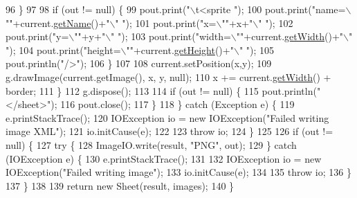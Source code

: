 \begin{DoxyCode}
96                 \}
97                 
98                 \textcolor{keywordflow}{if} (out != null) \{
99                     pout.print(\textcolor{stringliteral}{"\(\backslash\)t<sprite "});
100                     pout.print(\textcolor{stringliteral}{"name=\(\backslash\)""}+current.\mbox{\hyperlink{classorg_1_1newdawn_1_1slick_1_1_image_a3d7329c13259ffebd9efc30deb5655fc}{getName}}()+\textcolor{stringliteral}{"\(\backslash\)" "});
101                     pout.print(\textcolor{stringliteral}{"x=\(\backslash\)""}+x+\textcolor{stringliteral}{"\(\backslash\)" "});
102                     pout.print(\textcolor{stringliteral}{"y=\(\backslash\)""}+y+\textcolor{stringliteral}{"\(\backslash\)" "});
103                     pout.print(\textcolor{stringliteral}{"width=\(\backslash\)""}+current.\mbox{\hyperlink{classorg_1_1newdawn_1_1slick_1_1_image_a94a5d32276e8a27930480223c5d69e11}{getWidth}}()+\textcolor{stringliteral}{"\(\backslash\)" "});
104                     pout.print(\textcolor{stringliteral}{"height=\(\backslash\)""}+current.\mbox{\hyperlink{classorg_1_1newdawn_1_1slick_1_1_image_aa2594a93f5126f60ad8a72444fceee98}{getHeight}}()+\textcolor{stringliteral}{"\(\backslash\)" "});
105                     pout.println(\textcolor{stringliteral}{"/>"});
106                 \}
107                 
108                 current.setPosition(x,y);
109                 g.drawImage(current.getImage(), x, y, null);
110                 x += current.\mbox{\hyperlink{classorg_1_1newdawn_1_1slick_1_1_image_a94a5d32276e8a27930480223c5d69e11}{getWidth}}() + border;
111             \}
112             g.dispose();
113             
114             \textcolor{keywordflow}{if} (out != null) \{
115                 pout.println(\textcolor{stringliteral}{"</sheet>"});
116                 pout.close();
117             \}
118         \} \textcolor{keywordflow}{catch} (Exception e) \{
119             e.printStackTrace();
120             IOException io = \textcolor{keyword}{new} IOException(\textcolor{stringliteral}{"Failed writing image XML"});
121             io.initCause(e);
122             
123             \textcolor{keywordflow}{throw} io;
124         \}
125         
126         \textcolor{keywordflow}{if} (out != null) \{
127             \textcolor{keywordflow}{try} \{
128                 ImageIO.write(result, \textcolor{stringliteral}{"PNG"}, out);
129             \} \textcolor{keywordflow}{catch} (IOException e) \{
130                 e.printStackTrace();
131                 
132                 IOException io = \textcolor{keyword}{new} IOException(\textcolor{stringliteral}{"Failed writing image"});
133                 io.initCause(e);
134                 
135                 \textcolor{keywordflow}{throw} io;
136             \}
137         \}
138         
139         \textcolor{keywordflow}{return} \textcolor{keyword}{new} Sheet(result, images);
140     \}
\end{DoxyCode}
